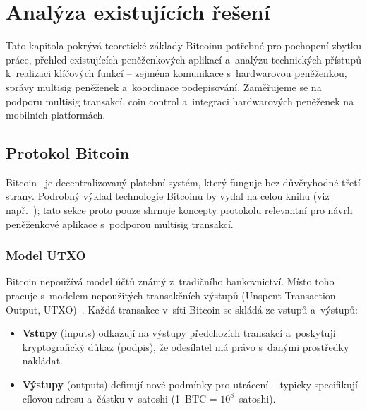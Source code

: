
\chapter{Analýza existujících řešení}
\label{chap:related}

Tato kapitola pokrývá teoretické základy Bitcoinu potřebné pro pochopení
zbytku práce, přehled existujících peněženkových aplikací a~analýzu
technických přístupů k~realizaci klíčových funkcí -- zejména komunikace
s~hardwarovou peněženkou, správy multisig peněženek a~koordinace
podepisování. Zaměřujeme se na podporu multisig transakcí, coin control
a~integraci hardwarových peněženek na mobilních platformách.


\section{Protokol Bitcoin}
\label{sec:bitcoin-basics}

Bitcoin~\citep{Nakamoto08} je decentralizovaný platební systém, který
funguje bez důvěryhodné třetí strany. Podrobný výklad technologie Bitcoinu
by vydal na celou knihu (viz např.~\citet{MasteringBitcoin}); tato sekce
proto pouze shrnuje koncepty protokolu relevantní pro návrh peněženkové
aplikace s~podporou multisig transakcí.

\subsection{Model UTXO}
\label{sec:utxo}

Bitcoin nepoužívá model účtů známý z~tradičního bankovnictví. Místo toho pracuje
s~modelem nepoužitých transakčních výstupů (Unspent Transaction Output,
UTXO)~\citep{Nakamoto08, MasteringBitcoin}. Každá transakce v~síti Bitcoin se skládá ze vstupů
a~výstupů:

\begin{itemize}
  \item \textbf{Vstupy} (inputs) odkazují na výstupy předchozích transakcí
    a~poskytují kryptografický důkaz (podpis), že odesílatel má právo s~danými
    prostředky nakládat.
  \item \textbf{Výstupy} (outputs) definují nové podmínky pro utrácení --
    typicky specifikují cílovou adresu a~částku v~satoshi (1~BTC
    = $10^8$~satoshi).
\end{itemize}

